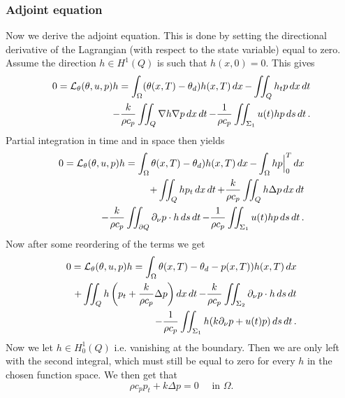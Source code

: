 \subsubsection{Adjoint equation}
Now we derive the adjoint equation. This is done by  setting the directional derivative of the Lagrangian (with respect to the state variable) equal to zero. Assume the direction $h\in H^1(Q)$ is such that $h(x, 0) = 0$. %
This gives
\begin{equation}
  \begin{aligned}
  0 = \mathcal{L}_\theta(\theta, u, p)h = \int_\Omega (\theta(x,T) - \theta_d)h(x, T)\mathop{dx} - \iint_Q h_t p\mathop{dx}\mathop{dt} \\
  - \frac{k}{\rho c_p}\iint_Q\nabla h\nabla p \mathop{dx}\mathop{dt}
  - \frac{1}{\rho c_p}\iint_{\Sigma_1} u(t)h p\mathop{ds}\mathop{dt}.
  \end{aligned}
\end{equation}
Partial integration in time and in space then yields
\begin{equation} %
  \begin{aligned}
  0 = \L_\theta(\theta, u, p)h = \int_\Omega \theta(x,T) - \theta_d)h(x, T)\dx - \int_\Omega hp\Big|_0^T \dx \\
  + \iint_Q h p_t\dxdt
  + \frac{k}{\rho c_p}\iint_Q h\Delta p \dxdt \\
  - \frac{k}{\rho c_p} \iint_{\partial Q}\partial_\nu p\cdot h\dsdt
  - \frac{1}{\rho c_p}\iint_{\Sigma_1} u(t)h p\dsdt.
  \end{aligned}
\end{equation}
Now after some reordering of the terms we get
\begin{equation}
  \begin{aligned}
  0 = \mathcal{L}_\theta(\theta, u, p)h = \int_\Omega \theta(x,T) - \theta_d-p(x, T))h(x, T)\mathop{dx} \\
  + \iint_Q h \left( p_t + \frac{k}{\rho c_p}\Delta p\right) \mathop{dx}\mathop{dt}
   - \frac{k}{\rho c_p} \iint_{\Sigma_2}\partial_\nu p\cdot h\mathop{ds}\mathop{dt} \\
   - \frac{1}{\rho c_p} \iint_{\Sigma_1}h(  k\partial_\nu p + u(t)p )\mathop{ds}\mathop{dt}.
  \end{aligned}
\end{equation}
Now we let $h\in H_0^1(Q)$ i.e. vanishing at the boundary. Then we are only left with the second integral, which must still be equal to zero for every $h$ in the chosen function space. We then get that
\begin{equation*}
  \rho c_p p_t + k\Delta p = 0 \quad\textrm{ in } \Omega.
\end{equation*}
